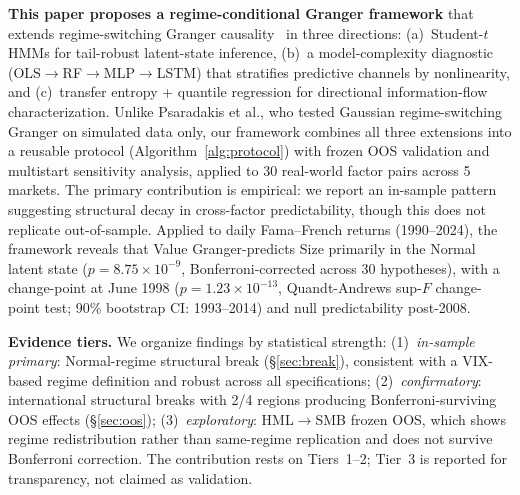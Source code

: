 \documentclass[sigconf,anonymous]{acmart}
\begin{document}
\textbf{This paper proposes a regime-conditional Granger framework}
that extends regime-switching Granger
causality~\cite{psaradakis2005markov} in three directions: (a)~Student-$t$
HMMs for tail-robust latent-state inference, (b)~a model-complexity
diagnostic (OLS$\to$RF$\to$MLP$\to$LSTM) that stratifies predictive
channels by nonlinearity, and (c)~transfer entropy + quantile
regression for directional information-flow characterization.
Unlike Psaradakis et al., who tested Gaussian regime-switching Granger
on simulated data only, our framework combines all three extensions
into a reusable protocol (Algorithm~\ref{alg:protocol}) with frozen OOS
validation and multistart sensitivity analysis, applied to 30 real-world
factor pairs across 5 markets. The primary contribution is empirical:
we report an in-sample pattern suggesting structural decay in cross-factor
predictability, though this does not replicate out-of-sample.
Applied to daily Fama--French returns (1990--2024), the
framework reveals that Value Granger-predicts Size
primarily in the Normal latent state ($p = 8.75 \times 10^{-9}$,
Bonferroni-corrected across 30 hypotheses), with a change-point at
June 1998 ($p = 1.23 \times 10^{-13}$, Quandt-Andrews sup-$F$
change-point test; 90\% bootstrap CI: 1993--2014) and null predictability post-2008.

\textbf{Evidence tiers.} We organize findings by statistical strength:
(1)~\emph{in-sample primary}: Normal-regime structural break
(\S\ref{sec:break}), consistent with a VIX-based regime definition
and robust across all specifications;
(2)~\emph{confirmatory}: international structural breaks with 2/4 regions
producing Bonferroni-surviving OOS effects (\S\ref{sec:oos});
(3)~\emph{exploratory}: HML$\to$SMB frozen OOS, which shows regime
redistribution rather than same-regime replication and does not
survive Bonferroni correction.
The contribution rests on Tiers~1--2; Tier~3 is reported for
transparency, not claimed as validation.
\end{document}
